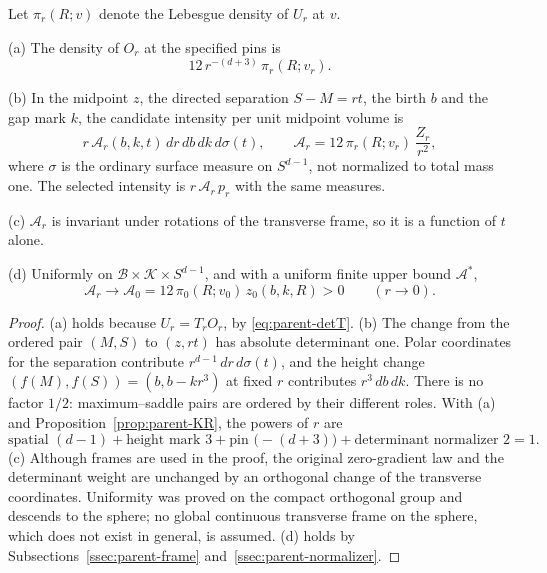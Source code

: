 \begin{proposition}\label{prop:parent-ledger}
Let $\pi_r(R;v)$ denote the Lebesgue density of $U_r$ at $v$.

\textup{(a)} The density of $O_r$ at the specified pins is
\begin{equation}\label{eq:parent-101}
12\,r^{-(d+3)}\,\pi_r(R;v_r).
\end{equation}

\textup{(b)} In the midpoint $z$, the directed separation $S-M=rt$, the birth $b$ and the gap mark $k$, the candidate intensity per unit midpoint volume is
\begin{equation}\label{eq:parent-102}
r\,\mathcal A_r(b,k,t)\,dr\,db\,dk\,d\sigma(t),\qquad \mathcal A_r=12\,\pi_r(R;v_r)\,\frac{Z_r}{r^2},
\end{equation}
where $\sigma$ is the ordinary surface measure on $S^{d-1}$, not normalized to total mass one. The selected intensity is $r\,\mathcal A_r\,p_r$ with the same measures.

\textup{(c)} $\mathcal A_r$ is invariant under rotations of the transverse frame, so it is a function of $t$ alone.

\textup{(d)} Uniformly on $\mathcal B\times\mathcal K\times S^{d-1}$, and with a uniform finite upper bound $\mathcal A^*$,
\begin{equation}\label{eq:parent-103}
\mathcal A_r\longrightarrow\mathcal A_0=12\,\pi_0(R;v_0)\,z_0(b,k,R)>0\qquad(r\to0).
\end{equation}
\end{proposition}

\begin{proof}
(a) holds because $U_r=T_rO_r$, by \eqref{eq:parent-detT}. (b) The change from the ordered pair $(M,S)$ to $(z,rt)$ has absolute determinant one. Polar coordinates for the separation contribute $r^{d-1}\,dr\,d\sigma(t)$, and the height change $(f(M),f(S))=(b,b-kr^3)$ at fixed $r$ contributes $r^3\,db\,dk$. There is no factor $1/2$: maximum--saddle pairs are ordered by their different roles. With (a) and Proposition~\ref{prop:parent-KR}, the powers of $r$ are
\[
\text{spatial }(d-1)+\text{height mark }3+\text{pin }\bigl(-(d+3)\bigr)+\text{determinant normalizer }2=1 .
\]
(c) Although frames are used in the proof, the original zero-gradient law and the determinant weight are unchanged by an orthogonal change of the transverse coordinates. Uniformity was proved on the compact orthogonal group and descends to the sphere; no global continuous transverse frame on the sphere, which does not exist in general, is assumed. (d) holds by Subsections~\ref{ssec:parent-frame} and~\ref{ssec:parent-normalizer}.
\end{proof}

